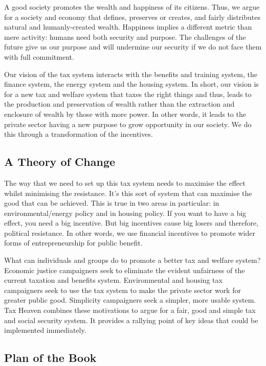 \documentclass[]{tufte-handout}
\begin{document}
A good society promotes the wealth and happiness of its citizens. Thus,
we argue for a society and economy that defines, preserves or creates,
and fairly distributes natural and humanly-created wealth. Happiness
implies a different metric than mere activity: humans need both security
and purpose. The challenges of the future give us our purpose and will
undermine our security if we do not face them with full commitment.

Our vision of the tax system interacts with the benefits and training
system, the finance system, the energy system and the housing system. In
short, our vision is for a new tax and welfare system that taxes the
right things and thus, leads to the production and preservation of
wealth rather than the extraction and enclosure of wealth by those with
more power. In other words, it leads to the private sector having a new
purpose to grow opportunity in our society. We do this through a
transformation of the incentives.

\hypertarget{a-theory-of-change}{%
\subsection{A Theory of Change}\label{a-theory-of-change}}

The way that we need to set up this tax system needs to maximise the
effect whilst minimising the resistance. It's this sort of system that
can maximise the good that can be achieved. This is true in two areas in
particular: in environmental/energy policy and in housing policy. If you
want to have a big effect, you need a big incentive. But big incentives
cause big losers and therefore, political resistance. In other words, we
use financial incentives to promote wider forms of entrepreneurship for
public benefit.

What can individuals and groups do to promote a better tax and welfare
system? Economic justice campaigners seek to eliminate the evident
unfairness of the current taxation and benefits system. Environmental
and housing tax campaigners seek to use the tax system to make the
private sector work for greater public good. Simplicity campaigners seek
a simpler, more usable system. Tax Heaven combines these motivations to
argue for a fair, good and simple tax and social security system. It
provides a rallying point of key ideas that could be implemented
immediately.

\hypertarget{plan-of-the-book}{%
\subsection{Plan of the Book}\label{plan-of-the-book}}
\end{document}
